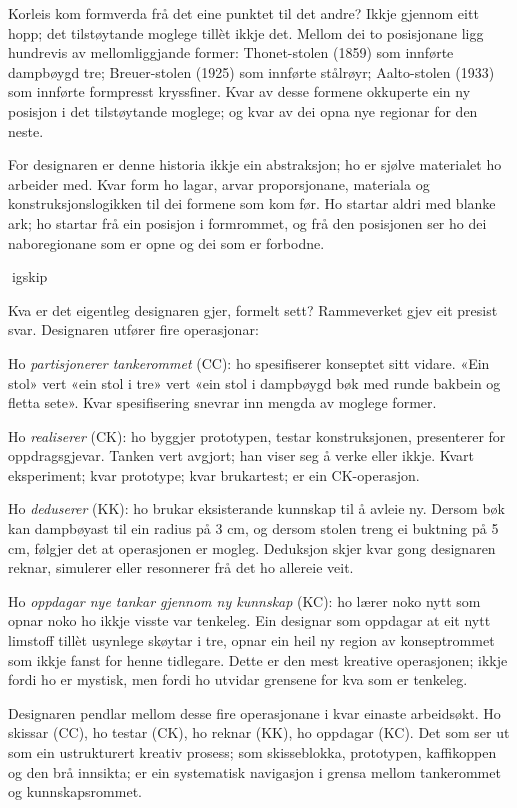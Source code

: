 Korleis kom formverda frå det eine punktet til det andre? Ikkje gjennom eitt hopp; det tilstøytande moglege tillèt ikkje det. Mellom dei to posisjonane ligg hundrevis av mellomliggjande former: Thonet-stolen (1859) som innførte dampbøygd tre; Breuer-stolen (1925) som innførte stålrøyr; Aalto-stolen (1933) som innførte formpresst kryssfiner. Kvar av desse formene okkuperte ein ny posisjon i det tilstøytande moglege; og kvar av dei opna nye regionar for den neste.

For designaren er denne historia ikkje ein abstraksjon; ho er sjølve materialet ho arbeider med. Kvar form ho lagar, arvar proporsjonane, materiala og konstruksjonslogikken til dei formene som kom før. Ho startar aldri med blanke ark; ho startar frå ein posisjon i formrommet, og frå den posisjonen ser ho dei naboregionane som er opne og dei som er forbodne.

igskip

Kva er det eigentleg designaren gjer, formelt sett? Rammeverket gjev eit presist svar. Designaren utfører fire operasjonar:

Ho \textit{partisjonerer tankerommet} (CC): ho spesifiserer konseptet sitt vidare. «Ein stol» vert «ein stol i tre» vert «ein stol i dampbøygd bøk med runde bakbein og fletta sete». Kvar spesifisering snevrar inn mengda av moglege former.

Ho \textit{realiserer} (CK): ho byggjer prototypen, testar konstruksjonen, presenterer for oppdragsgjevar. Tanken vert avgjort; han viser seg å verke eller ikkje. Kvart eksperiment; kvar prototype; kvar brukartest; er ein CK-operasjon.

Ho \textit{deduserer} (KK): ho brukar eksisterande kunnskap til å avleie ny. Dersom bøk kan dampbøyast til ein radius på 3 cm, og dersom stolen treng ei buktning på 5 cm, følgjer det at operasjonen er mogleg. Deduksjon skjer kvar gong designaren reknar, simulerer eller resonnerer frå det ho allereie veit.

Ho \textit{oppdagar nye tankar gjennom ny kunnskap} (KC): ho lærer noko nytt som opnar noko ho ikkje visste var tenkeleg. Ein designar som oppdagar at eit nytt limstoff tillèt usynlege skøytar i tre, opnar ein heil ny region av konseptrommet som ikkje fanst for henne tidlegare. Dette er den mest kreative operasjonen; ikkje fordi ho er mystisk, men fordi ho utvidar grensene for kva som er tenkeleg.

Designaren pendlar mellom desse fire operasjonane i kvar einaste arbeidsøkt. Ho skissar (CC), ho testar (CK), ho reknar (KK), ho oppdagar (KC). Det som ser ut som ein ustrukturert kreativ prosess; som skisseblokka, prototypen, kaffikoppen og den brå innsikta; er ein systematisk navigasjon i grensa mellom tankerommet og kunnskapsrommet.

